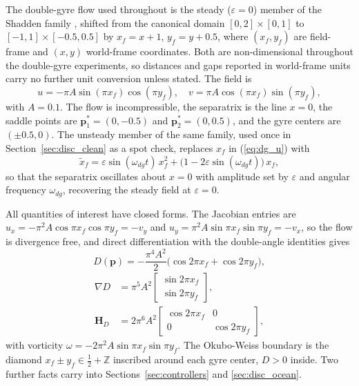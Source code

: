 \documentclass[lettersize,journal]{IEEEtran}
\begin{document}
The double-gyre flow used throughout is the steady ($\varepsilon = 0$)
member of the Shadden family \cite{11}, shifted from the canonical domain
$[0,2] \times [0,1]$ to $[-1,1] \times [-0.5, 0.5]$ by
$x_f = x + 1$, $y_f = y + 0.5$, where $(x_f, y_f)$ are field-frame and
$(x, y)$ world-frame coordinates. Both are non-dimensional throughout the
double-gyre experiments, so distances and gaps reported in world-frame
units carry no further unit conversion unless stated. The field is
\begin{equation}
    u = -\pi A \sin(\pi x_f) \cos(\pi y_f), \quad
    v = \pi A \cos(\pi x_f) \sin(\pi y_f),
    \label{eq:dg_u}
\end{equation}
with $A = 0.1$. The flow is incompressible, the separatrix is the line
$x = 0$, the saddle points are $\mathbf{p}^*_1 = (0, -0.5)$ and
$\mathbf{p}^*_2 = (0, 0.5)$, and the gyre centers are $(\pm 0.5, 0)$.
The unsteady member of the same family, used once in
Section~\ref{sec:disc_clean} as a spot check, replaces $x_f$ in
(\ref{eq:dg_u}) with
\begin{equation}
    \tilde{x}_f = \varepsilon \sin(\omega_{dg} t)\,x_f^2
        + \bigl(1 - 2\varepsilon\sin(\omega_{dg} t)\bigr)\,x_f ,
    \label{eq:dg_unsteady}
\end{equation}
so that the separatrix oscillates about $x = 0$ with amplitude set by
$\varepsilon$ and angular frequency $\omega_{dg}$, recovering the steady
field at $\varepsilon = 0$.

All quantities of interest have closed forms. The Jacobian entries are
$u_x = -\pi^2 A \cos\pi x_f \cos\pi y_f = -v_y$ and
$u_y = \pi^2 A \sin\pi x_f \sin\pi y_f = -v_x$, so the flow is divergence
free, and direct differentiation with the double-angle
identities gives
\begin{equation}
    D(\mathbf{p}) = -\frac{\pi^4 A^2}{2}
    \bigl(\cos 2\pi x_f + \cos 2\pi y_f\bigr),
    \label{eq:det_analytic_main}
\end{equation}
\begin{equation}
    \begin{aligned}
    \nabla D &= \pi^5 A^2
    \begin{bmatrix} \sin 2\pi x_f \\ \sin 2\pi y_f \end{bmatrix},
    \\
    \mathbf{H}_D &= 2\pi^6 A^2
    \begin{bmatrix} \cos 2\pi x_f & 0 \\ 0 & \cos 2\pi y_f \end{bmatrix},
    \end{aligned}
    \label{eq:gradhess_analytic_main}
\end{equation}
with vorticity $\omega = -2\pi^2 A \sin\pi x_f \sin\pi y_f$. The
Okubo-Weiss boundary is the diamond $x_f \pm y_f \in \tfrac{1}{2} +
\mathbb{Z}$ inscribed around each gyre center, $D > 0$ inside. Two
further facts carry into Sections~\ref{sec:controllers} and
\ref{sec:disc_ocean}.
\end{document}
